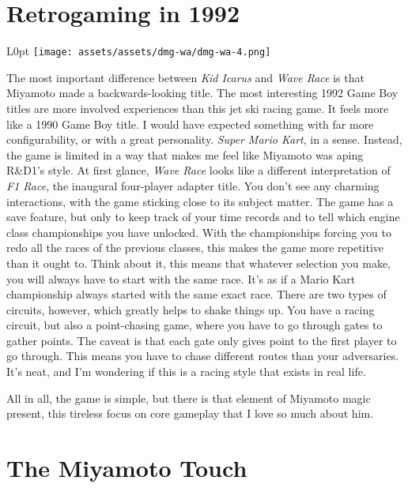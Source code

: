 \documentclass{book}
\begin{document}
\FloatBarrier\needspace{10mm}\section*{Retrogaming in 1992}\nopagebreak[4]

\begin{wrapfigure}{L}{0pt} \texttt{[image: assets/assets/dmg-wa/dmg-wa-4.png]}\end{wrapfigure}
The most important difference between \emph{Kid Icarus} and \emph{Wave Race} is that Miyamoto made a backwards-looking title. The most interesting 1992 Game Boy titles are more involved experiences than this jet ski racing game. It feels more like a 1990 Game Boy title. I would have expected something with far more configurability, or with a great personality. \emph{Super Mario Kart}, in a sense. Instead, the game is limited in a way that makes me feel like Miyamoto was aping R\&D1’s style. At first glance, \emph{Wave Race} looks like a different interpretation of \emph{F1 Race}, the inaugural four-player adapter title. You don’t see any charming interactions, with the game sticking close to its subject matter. The game has a save feature, but only to keep track of your time records and to tell which engine class championships you have unlocked. With the championships forcing you to redo all the races of the previous classes, this makes the game more repetitive than it ought to. Think about it, this means that whatever selection you make, you will always have to start with the same race. It’s as if a Mario Kart championship always started with the same exact race. There are two types of circuits, however, which greatly helps to shake things up. You have a racing circuit, but also a point-chasing game, where you have to go through gates to gather points. The caveat is that each gate only gives point to the first player to go through. This means you have to chase different routes than your adversaries. It’s neat, and I’m wondering if this is a racing style that exists in real life.

All in all, the game is simple, but there is that element of Miyamoto magic present, this tireless focus on core gameplay that I love so much about him.

\FloatBarrier\needspace{10mm}\section*{The Miyamoto Touch}\nopagebreak[4]
\end{document}

